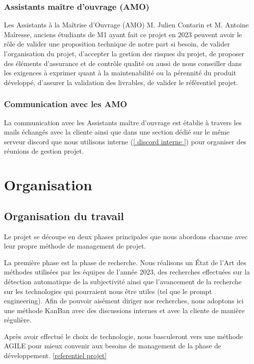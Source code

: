 \documentclass[11pt]{rapport_class}
\begin{document}
\subsection{Assistants maître d'ouvrage (AMO)}

Les Assistants à la Maîtrise d'Ouvrage (AMO) M. Julien Contarin et M. Antoine Maîresse, anciens étudiants de M1 ayant fait ce projet en 2023 peuvent avoir le rôle de valider une proposition technique de notre part si besoin, de valider l'organisation du projet, d'accepter la gestion des risques du projet, de proposer des éléments d'assurance et de contrôle qualité ou aussi de nous conseiller dans les exigences à exprimer quant à la maintenabilité ou la pérennité du produit développé, d'assurer la validation des livrables, de valider le référentiel projet.

\subsection{Communication avec les AMO} 

La communication avec les Assistants maître d'ouvrage est établie à travers les mails échangés avec la cliente ainsi que dans une section dédié sur le même serveur discord que nous utilisons interne (\ref{ discord interne }) pour organiser des réunions de gestion projet.



\chapter{Organisation}
\section{Organisation du travail}
\qquad Le projet se découpe en deux phases principales que nous abordons chacune avec leur propre méthode de management de projet.

La première phase est la phase de recherche. Nous réalisons un État de l'Art des méthodes utilisées par les équipes de l'année 2023, des recherches effectuées sur la détection automatique de la subjectivité ainsi que l'avancement de la recherche sur les technologies qui pourraient nous être utiles (tel que le prompt engineering). Afin de pouvoir aisément diriger nos recherches, nous adoptons ici une méthode KanBan avec des discussions internes et avec la cliente de manière régulière.

Après avoir effectué le choix de technologie, nous basculeront vers une méthode AGILE pour mieux convenir aux besoins de management de la phase de développement. \ref{referentiel projet}
\end{document}
